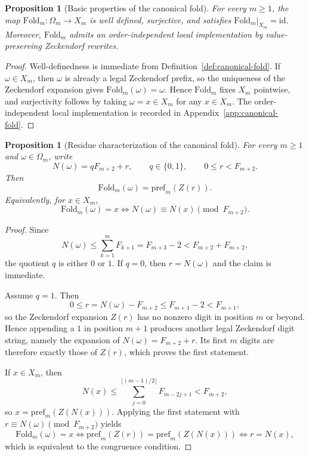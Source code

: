 \documentclass[11pt,letterpaper]{article}
\numberwithin{equation}{section}
\theoremstyle{plain}
\newtheorem{proposition}[theorem]{Proposition}
\theoremstyle{definition}
\theoremstyle{remark}
\newcommand{\Fold}{\mathrm{Fold}}
\newcommand{\pref}{\mathrm{pref}}
\begin{document}
\begin{proposition}[Basic properties of the canonical fold]\label{prop:canonical-fold-basic}
For every \(m\ge 1\), the map \(\Fold_m:\Omega_m\to X_m\) is well defined,
surjective, and satisfies \(\Fold_m|_{X_m}=\mathrm{id}\). Moreover,
\(\Fold_m\) admits an order-independent local implementation by
value-preserving Zeckendorf rewrites.
\end{proposition}

\begin{proof}
Well-definedness is immediate from Definition~\ref{def:canonical-fold}. If
\(\omega\in X_m\), then \(\omega\) is already a legal Zeckendorf prefix, so the
uniqueness of the Zeckendorf expansion gives \(\Fold_m(\omega)=\omega\). Hence
\(\Fold_m\) fixes \(X_m\) pointwise, and surjectivity follows by taking
\(\omega=x\in X_m\) for any \(x\in X_m\). The order-independent local
implementation is recorded in Appendix~\ref{app:canonical-fold}.
\end{proof}

\begin{proposition}[Residue characterization of the canonical fold]\label{prop:fold-residue-characterization}
For every \(m\ge 1\) and \(\omega\in\Omega_m\), write
\[
N(\omega)=qF_{m+2}+r,
\qquad q\in\{0,1\},
\qquad 0\le r<F_{m+2}.
\]
Then
\[
\Fold_m(\omega)=\pref_m(Z(r)).
\]
Equivalently, for \(x\in X_m\),
\[
\Fold_m(\omega)=x
\iff
N(\omega)\equiv N(x)\pmod{F_{m+2}}.
\]
\end{proposition}

\begin{proof}
Since
\[
N(\omega)\le \sum_{k=1}^m F_{k+1}=F_{m+3}-2<F_{m+2}+F_{m+2},
\]
the quotient \(q\) is either \(0\) or \(1\). If \(q=0\), then \(r=N(\omega)\)
and the claim is immediate.

Assume \(q=1\). Then
\[
0\le r=N(\omega)-F_{m+2}\le F_{m+1}-2<F_{m+1},
\]
so the Zeckendorf expansion \(Z(r)\) has no nonzero digit in position \(m\) or
beyond. Hence appending a \(1\) in position \(m+1\) produces another legal
Zeckendorf digit string, namely the expansion of \(N(\omega)=F_{m+2}+r\). Its
first \(m\) digits are therefore exactly those of \(Z(r)\), which proves the
first statement.

If \(x\in X_m\), then
\[
N(x)\le \sum_{j=0}^{\lfloor (m-1)/2\rfloor}F_{m-2j+1}<F_{m+2},
\]
so \(x=\pref_m(Z(N(x)))\). Applying the first statement with
\(r\equiv N(\omega)\pmod{F_{m+2}}\) yields
\[
\Fold_m(\omega)=x
\iff
\pref_m(Z(r))=\pref_m(Z(N(x)))
\iff
r=N(x),
\]
which is equivalent to the congruence condition.
\end{proof}
\end{document}
